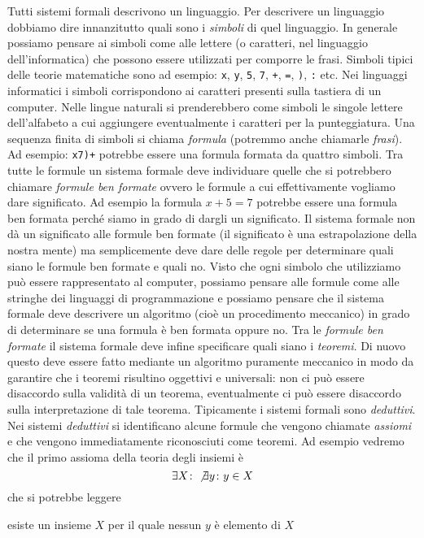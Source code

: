 Tutti sistemi formali descrivono un linguaggio.
Per descrivere un linguaggio dobbiamo dire innanzitutto quali sono i \emph{simboli}%
%
di quel linguaggio. In generale possiamo pensare ai simboli come alle lettere 
(o caratteri, nel linguaggio dell'informatica) che possono essere utilizzati per comporre le frasi.
Simboli tipici delle teorie matematiche sono ad esempio: 
\texttt{x}, \texttt{y}, \texttt{5}, \texttt{7}, 
\texttt{+}, \texttt{=}, \texttt{)}, \texttt{:} etc.
Nei linguaggi informatici i simboli corrispondono ai caratteri presenti sulla tastiera 
di un computer. 
Nelle lingue naturali si prenderebbero come simboli le singole lettere dell'alfabeto
a cui aggiungere eventualmente i caratteri per la punteggiatura.
Una sequenza finita di simboli si chiama \emph{formula}%
%
 (potremmo anche chiamarle \emph{frasi}).
Ad esempio: \texttt{x7)+} potrebbe essere una formula formata da quattro simboli.
Tra tutte le formule un sistema formale deve individuare quelle che si potrebbero chiamare 
\emph{formule ben formate} ovvero le formule a cui effettivamente vogliamo dare significato.
Ad esempio la formula $x+5=7$ potrebbe essere una formula ben formata perché siamo in grado 
di dargli un significato.
Il sistema formale non dà un significato alle formule ben formate 
(il significato è una estrapolazione della nostra mente) ma semplicemente deve dare delle regole 
per determinare quali siano le formule ben formate e quali no.
Visto che ogni simbolo che utilizziamo può essere rappresentato al computer, possiamo pensare 
alle formule come alle stringhe dei linguaggi di programmazione e possiamo pensare che il sistema formale 
deve descrivere un algoritmo (cioè un procedimento meccanico) in grado di determinare 
se una formula è ben formata oppure no.
Tra le \emph{formule ben formate} il sistema formale deve infine specificare quali 
siano i \emph{teoremi}. 
Di nuovo questo deve essere fatto mediante un algoritmo puramente meccanico 
in modo da garantire che i teoremi risultino oggettivi e universali: 
non ci può essere disaccordo sulla validità di un teorema, eventualmente 
ci può essere disaccordo 
sulla interpretazione di tale teorema.
Tipicamente i sistemi formali sono \emph{deduttivi}.
Nei sistemi \emph{deduttivi} si identificano alcune formule che vengono 
chiamate
 \emph{assiomi} e che vengono immediatamente riconosciuti come teoremi.
Ad esempio vedremo che il primo assioma della teoria degli insiemi è 
\[
  \exists X\colon \not \exists y\colon y\in X
\]
che si potrebbe leggere 
\begin{displayquote}
esiste un insieme $X$ per il quale nessun $y$ è elemento di $X$
\end{displayquote}
